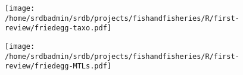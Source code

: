 \documentclass[letterpaper,12pt]{article}
\begin{document}
\begin{figure}
\begin{center}
\texttt{[image: /home/srdbadmin/srdb/projects/fishandfisheries/R/first-review/friedegg-taxo.pdf]}
\end{center}
\caption{ }
\label{fig:taxo}
\end{figure}


\begin{landscape}
\begin{figure}
\begin{center}
\texttt{[image: /home/srdbadmin/srdb/projects/fishandfisheries/R/first-review/friedegg-MTLs.pdf]}
\end{center}
\caption{ }
\label{fig:mtl}
\end{figure}
\end{landscape}
\end{document}
